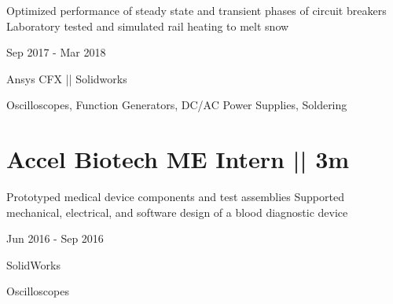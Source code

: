 \documentclass[letterpaper,10pt,oneside]{article}
\begin{document}
\begin{body}
\BulletItem
\vspace{-2.5ex}
\begin{detail}

\BulletItem
 Optimized performance of steady state and transient phases of circuit breakers
\BulletItem
 Laboratory tested and simulated rail heating to melt snow
\end{detail}

\begin{subtitle}
\vspace{-7.8ex}
{{Sep 2017 - Mar 2018}}
\end{subtitle}
\vspace{0ex}

\vspace{-1.5ex}
{
\vspace{1.8ex}
\color{cyan}\small
{Ansys CFX || Solidworks} %
}

{
\vspace{-0.3ex}
\color{cyan}\small
{Oscilloscopes, Function Generators, DC/AC Power Supplies, Soldering} %
}
\vspace{-1.5ex}


\section
{\textbf{Accel Biotech}
\newline
ME Intern || 3m}

\BulletItem
\vspace{-2.5ex}
\begin{detail}
\BulletItem
Prototyped medical device components and test assemblies
\BulletItem
Supported mechanical, electrical, and software design of a blood diagnostic device
\end{detail}

\begin{subtitle}
\vspace{-7.8ex}
{{Jun 2016 - Sep 2016}}
\end{subtitle}
\vspace{0ex}

{
\vspace{0.5ex}
\color{cyan}\small
{SolidWorks} %
}

{
\vspace{-2.5ex}\hspace{3.17in}
\color{cyan}\small
{Oscilloscopes} %
}
\vspace{-1.5ex}



\end{body}
\end{document}
